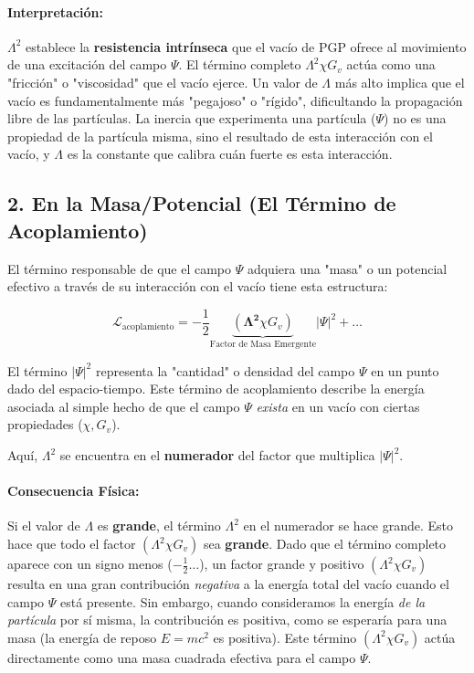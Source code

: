 \documentclass{article}
\newcommand{\LambdaSq}{\Lambda^2}
\newcommand{\Lagrangian}{\mathcal{L}}
\newcommand{\PsiF}{\Psi}
\newcommand{\Chi}{\chi}
\newcommand{\Gv}{G_v}
\newcommand{\AbsPsiSq}{|\PsiF|^2}
\begin{document}
\paragraph{Interpretación:}
$\LambdaSq$ establece la \textbf{resistencia intrínseca} que el vacío de PGP ofrece al movimiento de una excitación del campo $\Psi$. El término completo $\LambdaSq \Chi \Gv$ actúa como una "fricción" o "viscosidad" que el vacío ejerce. Un valor de $\Lambda$ más alto implica que el vacío es fundamentalmente más "pegajoso" o "rígido", dificultando la propagación libre de las partículas. La inercia que experimenta una partícula ($\Psi$) no es una propiedad de la partícula misma, sino el resultado de esta interacción con el vacío, y $\Lambda$ es la constante que calibra cuán fuerte es esta interacción.

\subsection{2. En la Masa/Potencial (El Término de Acoplamiento)}

El término responsable de que el campo $\Psi$ adquiera una "masa" o un potencial efectivo a través de su interacción con el vacío tiene esta estructura:

\[
\Lagrangian_{\text{acoplamiento}} = -\frac{1}{2}\underbrace{(\mathbf{\Lambda^2}\Chi \Gv)}_{\text{Factor de Masa Emergente}} \AbsPsiSq + \dots
\]

\noindent El término $\AbsPsiSq$ representa la "cantidad" o densidad del campo $\Psi$ en un punto dado del espacio-tiempo. Este término de acoplamiento describe la energía asociada al simple hecho de que el campo $\Psi$ \emph{exista} en un vacío con ciertas propiedades ($\Chi, \Gv$).

Aquí, $\LambdaSq$ se encuentra en el \textbf{numerador} del factor que multiplica $\AbsPsiSq$.

\paragraph{Consecuencia Física:}
Si el valor de $\Lambda$ es \textbf{grande}, el término $\LambdaSq$ en el numerador se hace grande. Esto hace que todo el factor $(\LambdaSq \Chi \Gv)$ sea \textbf{grande}. Dado que el término completo aparece con un signo menos ($-\frac{1}{2} \dots$), un factor grande y positivo $(\LambdaSq \Chi \Gv)$ resulta en una gran contribución \emph{negativa} a la energía total del vacío cuando el campo $\Psi$ está presente. Sin embargo, cuando consideramos la energía \emph{de la partícula} por sí misma, la contribución es positiva, como se esperaría para una masa (la energía de reposo $E=mc^2$ es positiva). Este término $(\LambdaSq \Chi \Gv)$ actúa directamente como una masa cuadrada efectiva para el campo $\Psi$.
\end{document}
